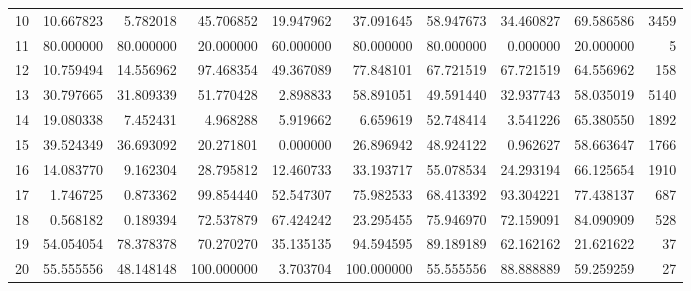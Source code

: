 \begin{table}
\begin{tabular}{lrrrrrrrrr}
10   &          10.667823 &          5.782018 &      45.706852 &            19.947962 &   37.091645 &  58.947673 &       34.460827 &  69.586586 &  3459 \\
11   &          80.000000 &         80.000000 &      20.000000 &            60.000000 &   80.000000 &  80.000000 &        0.000000 &  20.000000 &     5 \\
12   &          10.759494 &         14.556962 &      97.468354 &            49.367089 &   77.848101 &  67.721519 &       67.721519 &  64.556962 &   158 \\
13   &          30.797665 &         31.809339 &      51.770428 &             2.898833 &   58.891051 &  49.591440 &       32.937743 &  58.035019 &  5140 \\
14   &          19.080338 &          7.452431 &       4.968288 &             5.919662 &    6.659619 &  52.748414 &        3.541226 &  65.380550 &  1892 \\
15   &          39.524349 &         36.693092 &      20.271801 &             0.000000 &   26.896942 &  48.924122 &        0.962627 &  58.663647 &  1766 \\
16   &          14.083770 &          9.162304 &      28.795812 &            12.460733 &   33.193717 &  55.078534 &       24.293194 &  66.125654 &  1910 \\
17   &           1.746725 &          0.873362 &      99.854440 &            52.547307 &   75.982533 &  68.413392 &       93.304221 &  77.438137 &   687 \\
18   &           0.568182 &          0.189394 &      72.537879 &            67.424242 &   23.295455 &  75.946970 &       72.159091 &  84.090909 &   528 \\
19   &          54.054054 &         78.378378 &      70.270270 &            35.135135 &   94.594595 &  89.189189 &       62.162162 &  21.621622 &    37 \\
20   &          55.555556 &         48.148148 &     100.000000 &             3.703704 &  100.000000 &  55.555556 &       88.888889 &  59.259259 &    27 \\
\bottomrule
\end{tabular}
\end{table}
